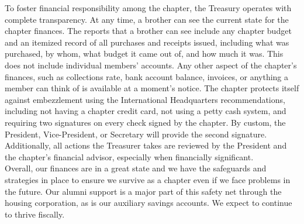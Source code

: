     To foster financial responsibility among the chapter, the Treasury operates with complete transparency. At any time, a brother can see the current state for the chapter finances. The reports that a brother can see include any chapter budget and an itemized record of all purchases and receipts issued, including what was purchased, by whom, what budget it came out of, and how much it was. This does not include individual members' accounts. Any other aspect of the chapter's finances, such as collections rate, bank account balance, invoices, or anything a member can think of is available at a moment's notice. The chapter protects itself against embezzlement using the International Headquarters recommendations, including not having a chapter credit card, not using a petty cash system, and requiring two signatures on every check signed by the chapter. By custom, the President, Vice-President, or Secretary will provide the second signature. Additionally, all actions the Treasurer takes are reviewed by the President and the chapter’s financial advisor, especially when financially significant. \\

    Overall, our finances are in a great state and we have the safeguards and strategies in place to ensure we survive as a chapter even if we face problems in the future. Our alumni support is a major part of this safety net through the housing corporation, as is our auxiliary savings accounts. We expect to continue to thrive fiscally.